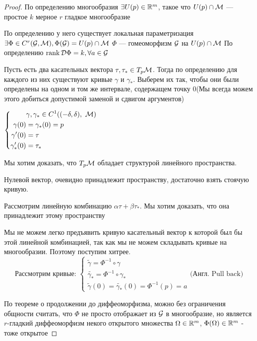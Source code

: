 \begin{proof}
По определению многообразия $\exists U(p) \in \mathbb{R}^{m}$, такое что $U(p) \cap \mathcal{M}$ — простое $k$ мерное $r$ гладкое многообразие

По определению у него существует локальная параметризация $\exists \Phi \in C^{r} (\mathcal{G}, \mathcal{M}), \Phi(\mathcal{G}) = U(p) \cap \mathcal{M} $ $\Phi$ — гомеоморфизм $\mathcal{G}$ на $U(p) \cap \mathcal{M}$ По определению $\operatorname{rank} \mathcal{D} \Phi = k, \forall a \in \mathcal{G}$

Пусть есть два касательных вектора $\tau, \tau_{*} \in T_p \mathcal{M}$. Тогда по определению для каждого из них существуют кривые $\gamma$ и $\gamma_{*}$. Выберем их так, чтобы они были определены на одном и том же интервале, содержащем точку 0(Мы всегда можем этого добиться допустимой заменой и сдвигом аргументов)

$
\left\{ \begin{aligned} 
  & \gamma, \gamma_* \in C^{1} ( (-\delta, \delta) ,\ \mathcal{M} )  \\
  \gamma(0) &= \gamma_{*}(0) = p \\
  \gamma'(0) &= \tau \\
  \gamma_{*}'(0) &= \tau_{*} 
\end{aligned} \right.
$

Мы хотим доказать, что $T_p \mathcal{M}$ обладает структурой линейного пространства.

Нулевой вектор, очевидно принадлежит пространству, достаточно взять стоячую кривую.

Рассмотрим линейную комбинацию $\alpha \tau + \beta \tau_{*}$. Мы хотим доказать, что она принадлежит этому пространству 

Мы не можем легко предъявить кривую касательный вектор к которой был бы этой линейной комбинацией, так как мы не можем складывать кривые на многообразии. Поэтому поступим хитрее.
\[
\text{Рассмотрим кривые: }
\begin{cases}
    \widetilde{\gamma} = \Phi^{-1} \circ \gamma  \\
    \widetilde{\gamma_{*}}  = \Phi^{-1} \circ \gamma_{*} \\
     \widetilde{\gamma}(0) = \widetilde{\gamma_{*}}(0) = \Phi ^{-1}(p) = a
\end{cases}
\text{(Англ. Pull back)}
\]


По теореме о продолжении до диффеоморфизма, можно без ограничения общности считать, что $\Phi$ не просто отображает из $\mathcal{G}$ в многообразие, но является $r$-гладкий диффеоморфизм некого открытого множества $\Omega \in \mathbb{R}^{m}$, $\Phi(\Omega) \in \mathbb{R}^m$ - тоже открытое


\end{proof}
